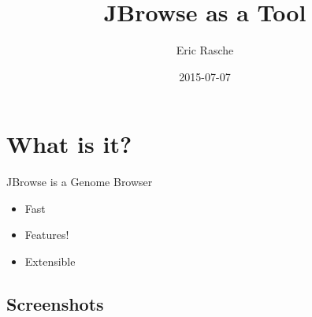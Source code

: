 \documentclass[12pt]{beamer} %
\title[JBrowse as a Tool]{JBrowse as a Tool}
\author[Eric Rasche]{Eric Rasche}
\date{2015-07-07}
\begin{document}
\frame{\titlepage}

\section{What is it?}
\begin{frame}{JBrowse is a Genome Browser}
	\begin{itemize}
    	\item Fast
        \item Features! 
        \item Extensible
    \end{itemize}
\end{frame}

\subsection{Screenshots}



{
  \begin{frame}[plain]
  \end{frame}
}

{
  \begin{frame}[plain]
  \end{frame}
}
\end{document}
